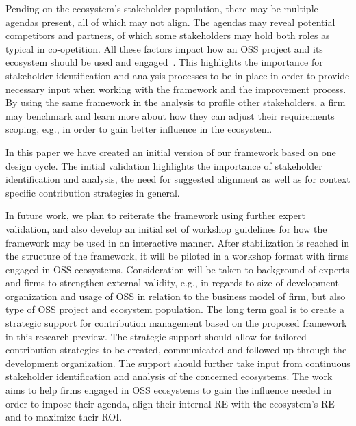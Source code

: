 \documentclass[a4paper]{llncs}
\begin{document}
Pending on the ecosystem’s stakeholder population, there may be multiple agendas present, all of which may not align. 
The agendas may reveal potential competitors and partners, of which some stakeholders may hold both roles as typical in co-opetition. All these factors impact how an OSS project and its ecosystem should be used and engaged~\cite{munir2015open}. This highlights the importance for stakeholder identification and analysis processes to be in place in order to provide necessary input when working with the framework and the improvement process. By using the same framework in the analysis to profile other stakeholders, a firm may benchmark and learn more about how they can adjust their requirements scoping, e.g., in order to gain better influence in the ecosystem.

In this paper we have created an initial version of our framework based on one design cycle. The initial validation highlights the importance of stakeholder identification and analysis, the need for suggested alignment as well as for context specific contribution strategies in general. 

In future work, we plan to reiterate the framework using further expert validation, and also develop an initial set of workshop guidelines for how the framework may be used in an interactive manner. After stabilization is reached in the structure of the framework, it will be piloted in a workshop format with firms engaged in OSS ecosystems. Consideration will be taken to background of experts and firms to strengthen external validity, e.g., in regards to size of development organization and usage of OSS in relation to the business model of firm, but also type of OSS project and ecosystem population. The long term goal is to create a strategic support for contribution management based on the proposed framework in this research preview. The strategic support should allow for tailored contribution strategies to be created, communicated and followed-up through the development organization. The support should further take input from continuous stakeholder identification and analysis of the concerned ecosystems. The work aims to help firms engaged in OSS ecosystems to gain the influence needed in order to impose their agenda, align their internal RE with the ecosystem's RE and to maximize their ROI.

\vspace{-0.3cm}


\end{document}
